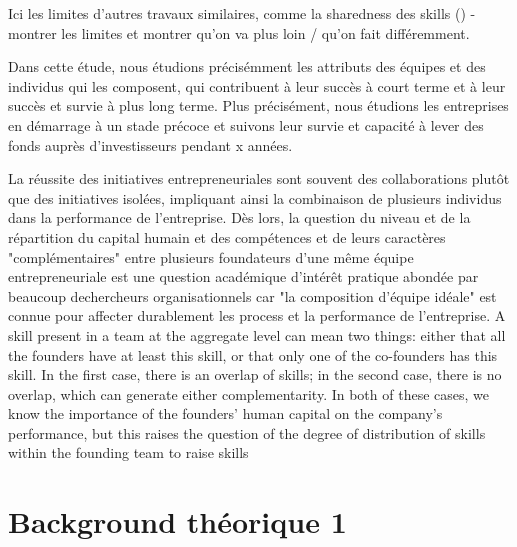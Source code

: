 \documentclass[11pt]{article}
\begin{document}
Ici les limites d'autres travaux similaires, comme la sharedness des skills (\citet{reese2020should}) - montrer les limites et montrer qu'on va plus loin / qu'on fait différemment.

Dans cette étude, nous étudions précisémment les attributs des équipes et des individus qui les composent, qui contribuent à leur succès à court terme et à leur succès et survie à plus long terme. Plus précisément, nous étudions les entreprises en démarrage à un stade précoce et suivons leur survie et capacité à lever des fonds auprès d'investisseurs pendant x années.

La réussite des initiatives entrepreneuriales sont souvent des collaborations plutôt que des initiatives isolées, impliquant ainsi la combinaison de plusieurs individus dans la performance de l'entreprise.  Dès lors, la question du niveau et de la répartition du capital humain et des compétences et de leurs caractères "complémentaires" entre plusieurs foundateurs d'une même équipe entrepreneuriale est une question académique d'intérêt pratique abondée par beaucoup dechercheurs organisationnels car "la composition d'équipe idéale" est connue pour affecter durablement les process et la performance de l'entreprise. A skill present in a team at the aggregate level can mean two things: either that all the founders have at least this skill, or that only one of the co-founders has this skill. In the first case, there is an overlap of skills; in the second case, there is no overlap, which can generate either complementarity. In both of these cases, we know the importance of the founders' human capital on the company's performance, but this raises the question of the degree of distribution of skills within the founding team to raise skills




\section{Background théorique 1}
\end{document}
